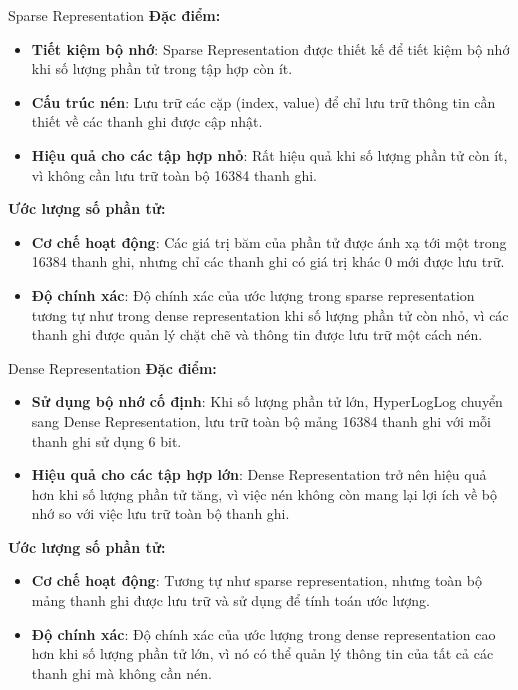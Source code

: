 \documentclass[10pt]{beamer}
\begin{document}
\begin{frame}[fragile]{Sparse Representation}
  \textbf{Đặc điểm:}
  \begin{itemize}
    \item \textbf{Tiết kiệm bộ nhớ}: Sparse Representation được thiết kế để 
    tiết kiệm bộ nhớ khi số lượng phần tử trong tập hợp còn ít.
    \item \textbf{Cấu trúc nén}: Lưu trữ các cặp (index, value) để chỉ 
    lưu trữ thông tin cần thiết về các thanh ghi được cập nhật.
    \item \textbf{Hiệu quả cho các tập hợp nhỏ}: Rất hiệu quả khi số lượng 
    phần tử còn ít, vì không cần lưu trữ toàn bộ 16384 thanh ghi.
  \end{itemize}
  \textbf{Ước lượng số phần tử:}
  \begin{itemize}
    \item \textbf{Cơ chế hoạt động}: Các giá trị băm của phần tử được ánh xạ 
    tới một trong 16384 thanh ghi, nhưng chỉ các thanh ghi có giá trị 
    khác 0 mới được lưu trữ.
    \item \textbf{Độ chính xác}: Độ chính xác của ước lượng trong sparse representation tương tự như trong dense representation khi số lượng phần tử còn nhỏ, vì các thanh ghi được quản lý chặt chẽ và thông tin được lưu trữ một cách nén.
  \end{itemize}
\end{frame}

\begin{frame}[fragile]{Dense Representation}
  \textbf{Đặc điểm:}
  \begin{itemize}
    \item \textbf{Sử dụng bộ nhớ cố định}:  Khi số lượng phần tử lớn, 
    HyperLogLog chuyển sang Dense Representation, lưu trữ toàn bộ mảng 16384 
    thanh ghi với mỗi thanh ghi sử dụng 6 bit.
    \item \textbf{Hiệu quả cho các tập hợp lớn}: Dense Representation trở nên 
    hiệu quả hơn khi số lượng phần tử tăng, vì việc nén không còn mang lại 
    lợi ích về bộ nhớ so với việc lưu trữ toàn bộ thanh ghi.
  \end{itemize}
  \textbf{Ước lượng số phần tử:}
  \begin{itemize}
    \item \textbf{Cơ chế hoạt động}: Tương tự như sparse representation, 
    nhưng toàn bộ mảng thanh ghi được lưu trữ và sử dụng để tính toán 
    ước lượng.
    \item \textbf{Độ chính xác}: Độ chính xác của ước lượng trong 
    dense representation cao hơn khi số lượng phần tử lớn, vì nó có thể 
    quản lý thông tin của tất cả các thanh ghi mà không cần nén.
  \end{itemize}
\end{frame}
\end{document}
